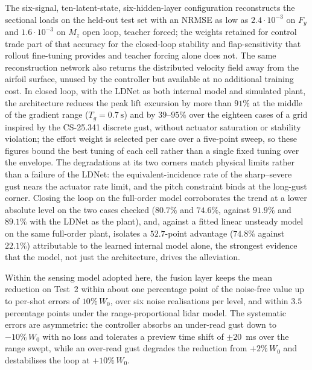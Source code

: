 The six-signal, ten-latent-state, six-hidden-layer configuration reconstructs the sectional
loads on the held-out test set with an NRMSE as low as $2.4\cdot10^{-3}$ on $F_y$ and
$1.6\cdot10^{-3}$ on $M_z$ open loop, teacher forced; the weights retained for control trade
part of that accuracy for the closed-loop stability and flap-sensitivity that rollout
fine-tuning provides and teacher forcing alone does not. The same reconstruction network also returns the
distributed velocity field away from the airfoil surface, unused by the controller but
available at no additional training cost. In closed loop, with the LDNet as both internal model
and simulated plant, the architecture reduces the peak lift excursion by more than $91\%$ at
the middle of the gradient range ($T_g = \SI{0.7}{\second}$) and by $39$--$95\%$ over the
eighteen cases of a grid inspired by the CS-25.341 discrete gust, without actuator saturation or stability violation;
the effort weight is selected per case over a five-point sweep, so these figures bound the best
tuning of each cell rather than a single fixed tuning over the envelope. The degradations at its
two corners match physical limits rather than a failure of the LDNet: the equivalent-incidence
rate of the sharp--severe gust nears the actuator rate limit, and the pitch constraint binds at
the long-gust corner. Closing the loop on the full-order model corroborates the trend at a lower
absolute level on the two cases checked ($80.7\%$ and $74.6\%$, against $91.9\%$ and $89.1\%$
with the LDNet as the plant), and, against a fitted linear unsteady model on the same full-order
plant, isolates a $52.7$-point advantage ($74.8\%$ against $22.1\%$) attributable to the learned
internal model alone, the strongest evidence that the model, not just the architecture, drives
the alleviation.

Within the sensing model adopted here, the fusion layer keeps the mean reduction on Test~2
within about one percentage point of the noise-free value up to per-shot errors of
$10\%\,W_0$, over six noise realisations per level, and within $3.5$ percentage points under
the range-proportional lidar model. The systematic errors are asymmetric: the controller absorbs an
under-read gust down to $-10\%\,W_0$ with no loss and tolerates a preview time shift of
$\pm20$~ms over the range swept, while an over-read gust degrades the reduction from
$+2\%\,W_0$ and destabilises the loop at $+10\%\,W_0$.

